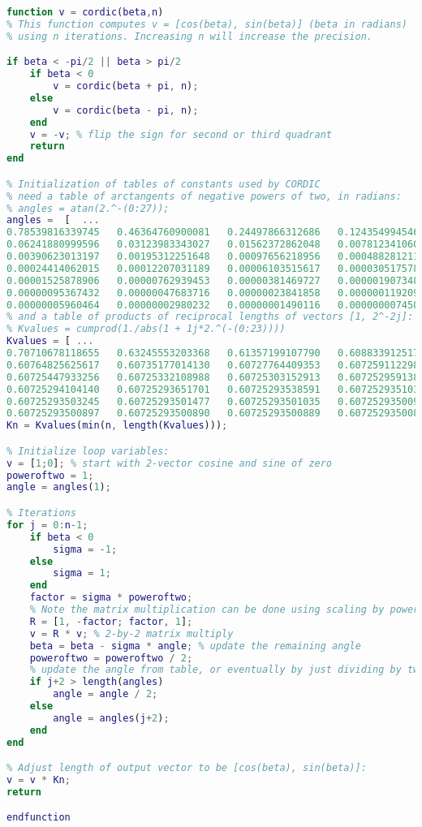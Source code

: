 \begin{lstlisting}[language=Matlab]
function v = cordic(beta,n)
% This function computes v = [cos(beta), sin(beta)] (beta in radians)
% using n iterations. Increasing n will increase the precision.

if beta < -pi/2 || beta > pi/2
	if beta < 0
		v = cordic(beta + pi, n);
	else
		v = cordic(beta - pi, n);
	end
	v = -v; % flip the sign for second or third quadrant
	return
end

% Initialization of tables of constants used by CORDIC
% need a table of arctangents of negative powers of two, in radians:
% angles = atan(2.^-(0:27));
angles =  [  ...
0.78539816339745   0.46364760900081   0.24497866312686   0.12435499454676 ...
0.06241880999596   0.03123983343027   0.01562372862048   0.00781234106010 ...
0.00390623013197   0.00195312251648   0.00097656218956   0.00048828121119 ...
0.00024414062015   0.00012207031189   0.00006103515617   0.00003051757812 ...
0.00001525878906   0.00000762939453   0.00000381469727   0.00000190734863 ...
0.00000095367432   0.00000047683716   0.00000023841858   0.00000011920929 ...
0.00000005960464   0.00000002980232   0.00000001490116   0.00000000745058 ];
% and a table of products of reciprocal lengths of vectors [1, 2^-2j]:
% Kvalues = cumprod(1./abs(1 + 1j*2.^(-(0:23))))
Kvalues = [ ...
0.70710678118655   0.63245553203368   0.61357199107790   0.60883391251775 ...
0.60764825625617   0.60735177014130   0.60727764409353   0.60725911229889 ...
0.60725447933256   0.60725332108988   0.60725303152913   0.60725295913894 ...
0.60725294104140   0.60725293651701   0.60725293538591   0.60725293510314 ...
0.60725293503245   0.60725293501477   0.60725293501035   0.60725293500925 ...
0.60725293500897   0.60725293500890   0.60725293500889   0.60725293500888 ];
Kn = Kvalues(min(n, length(Kvalues)));

% Initialize loop variables:
v = [1;0]; % start with 2-vector cosine and sine of zero
poweroftwo = 1;
angle = angles(1);

% Iterations
for j = 0:n-1;
	if beta < 0
		sigma = -1;
	else
		sigma = 1;
	end
	factor = sigma * poweroftwo;
	% Note the matrix multiplication can be done using scaling by powers of two and addition subtraction
	R = [1, -factor; factor, 1];
	v = R * v; % 2-by-2 matrix multiply
	beta = beta - sigma * angle; % update the remaining angle
	poweroftwo = poweroftwo / 2;
	% update the angle from table, or eventually by just dividing by two
	if j+2 > length(angles)
		angle = angle / 2;
	else
		angle = angles(j+2);
	end
end

% Adjust length of output vector to be [cos(beta), sin(beta)]:
v = v * Kn;
return

endfunction
\end{lstlisting}

